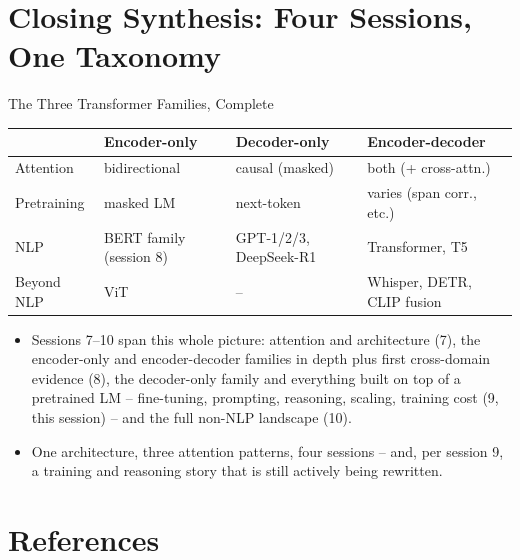 
\section{Closing Synthesis: Four Sessions, One Taxonomy}

\begin{vbframe}{The Three Transformer Families, Complete}
\begin{center}
\footnotesize
\begin{tabular}{@{}p{1.6cm}p{3.4cm}p{2.7cm}p{3.4cm}@{}}
\toprule
 & \textbf{Encoder-only} & \textbf{Decoder-only} & \textbf{Encoder-decoder} \\
\midrule
Attention & bidirectional & causal (masked) & both (+ cross-attn.) \\[2pt]
Pretraining & masked LM & next-token & varies (span corr., etc.) \\[2pt]
NLP & BERT family (session 8) & GPT-1/2/3, DeepSeek-R1 & Transformer, T5 \\[2pt]
Beyond NLP & ViT & -- & Whisper, DETR, CLIP fusion \\
\bottomrule
\end{tabular}
\end{center}
\begin{itemize}
  \item Sessions 7--10 span this whole picture: attention and architecture (7), the encoder-only and encoder-decoder families in depth plus first cross-domain evidence (8), the decoder-only family and everything built on top of a pretrained LM -- fine-tuning, prompting, reasoning, scaling, training cost (9, this session) -- and the full non-NLP landscape (10).
  \item One architecture, three attention patterns, four sessions -- and, per session 9, a training and reasoning story that is still actively being rewritten.
\end{itemize}
\end{vbframe}


\section{References}


